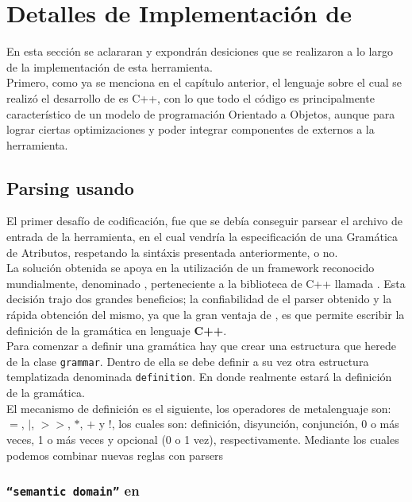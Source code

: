 \chapter{Detalles de Implementaci\'on de \maggen}
\label{chap:implem}
\minitoc

En esta sección se aclararan y expondrán desiciones que se realizaron a lo largo de la implementación de esta herramienta.\\
Primero, como ya se menciona en el capítulo anterior, el lenguaje sobre el cual se realizó el desarrollo de \maggen es C++, con lo que todo el código es principalmente característico de un modelo de programación Orientado a Objetos, aunque para lograr ciertas optimizaciones y poder integrar componentes de externos a la herramienta.

\section{Parsing usando \boost \ \spirit}

El primer desafío de codificación, fue que se debía conseguir parsear el archivo de entrada de la herramienta, en el cual vendría la especificación de una Gramática de Atributos, respetando la sintáxis presentada anteriormente, o no.\\
La solución obtenida se apoya en la utilización de un framework reconocido mundialmente, denominado \spirit, perteneciente a la biblioteca de C++ llamada \boost. Esta decisión trajo dos grandes beneficios; la confiabilidad de el parser obtenido y la rápida obtención del mismo, ya que la gran ventaja de \spirit, es que permite escribir la definición de la gramática en lenguaje \textbf{C++}.\\
Para comenzar a definir una gramática hay que crear una estructura que herede de la clase \texttt{grammar}. Dentro de ella se debe definir a su vez otra estructura templatizada denominada \texttt{definition}. En donde realmente estará la definición de la gramática.\\
El mecanismo de definición es el siguiente, los operadores de metalenguaje son: \texttt{$=$}, \texttt{$|$}, \texttt{$>>$}, \texttt{$*$}, \texttt{$+$} y \texttt{$!$}, los cuales son: definición, disyunción, conjunción, 0 o más veces, 1 o más veces y opcional (0 o 1 vez), respectivamente. Mediante los cuales podemos combinar nuevas reglas con parsers

\subsection{\texttt{``semantic domain''} en \spirit}

